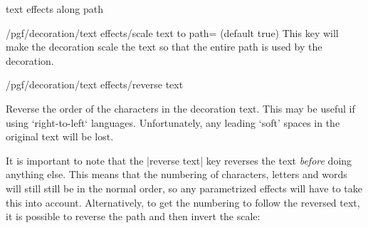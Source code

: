 \begin{decoration}{text effects along path}
\begin{key}{/pgf/decoration/text effects/scale text to path= (default true)}
 This key will make the decoration scale the text
  so that the entire path is used by the decoration.
  
\begin{codeexample}[]
\end{codeexample}
\end{key}


\begin{key}{/pgf/decoration/text effects/reverse text}

  Reverse the order of the characters in the decoration text.
  This may be useful if using `right-to-left` languages. 
  Unfortunately, any
  leading `soft' spaces in the original text will be lost.
  
\begin{codeexample}[]
\end{codeexample}

  It is important to note that the |reverse text| key reverses the
  text \emph{before} doing anything else. This means that the
  numbering of characters, letters and words will still
  still be in the normal order, so any parametrized effects
  will have to take this into account.
  Alternatively, to get the numbering 
  to follow the reversed text, it is possible to reverse the path and then
  invert the scale:
  
\begin{codeexample}[]

\begin{tikzpicture}[decoration={text effects along path,
  text={text effects along path!}, 
  text effects/.cd,
    path from text, path from text angle=60,
    character count=\i, character total=\n,
    characters={text along path, scale=\i/\n+0.5}}]


\end{tikzpicture}
\end{codeexample}
\end{key}
\end{decoration}
